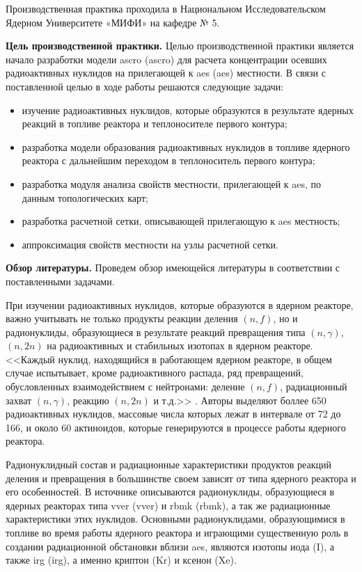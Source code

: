 
Производственная практика проходила в Национальном Исследовательском Ядерном Университете «МИФИ» на кафедре № 5. 

\textbf{Цель производственной практики.} Целью производственной практики является начало разработки модели \ac{ascro} 
(\acl{ascro}) для расчета концентрации осевших радиоактивных нуклидов на прилегающей к \ac{aes} (\acl{aes}) местности. 
В связи с поставленной целью в ходе работы решаются следующие задачи:

\begin{itemize}
	\item изучение радиоактивных нуклидов, которые образуются в результате ядерных реакций в топливе реактора и 
		теплоносителе первого контура;
	\item разработка модели образования радиоактивных нуклидов в топливе ядерного реактора с дальнейшим переходом в
		теплоноситель первого контура;
	\item разработка модуля анализа свойств местности, прилегающей к \ac{aes}, по данным топологических карт;
	\item разработка расчетной сетки, описывающей прилегающую к \ac{aes} местность;
	\item аппроксимация свойств местности на узлы расчетной сетки.
\end{itemize}

\textbf{Обзор литературы.} Проведем обзор имеющейся литературы в соответствии с поставленными задачами.

При изучении радиоактивных нуклидов, которые образуются в ядерном реакторе, важно учитывать не только продукты реакции 
деления $(n, f)$, но и радионуклиды, образующиеся в результате реакций превращения типа $(n, \gamma)$, $(n, 2n)$ на 
радиоактивных и стабильных изотопах в ядерном реакторе. <<Каждый нуклид, находящийся в работающем ядерном реакторе, в 
общем случае испытывает, кроме радиоактивного распада, ряд превращений, обусловленных взаимодействием с нейтронами: 
деление $(n, f)$, радиационный захват $(n, \gamma)$, реакцию $(n, 2n)$ и т.д.>> \citep[с.~6]{kolobashkin}.  
Авторы \cite{kolobashkin} выделяют боллее 650 радиоактивных нуклидов, массовые числа которых лежат в интервале от 72 до 
166, и около 60 актиноидов, которые генерируются в процессе работы ядерного реактора.

Радионуклидный состав и радиационные характеристики продуктов реакций деления и превращения в большинстве своем зависят 
от типа ядерного реактора и его особенностей. В источнике \cite{gusev_bio} описываются радионуклиды, образующиеся в 
ядерных реакторах типа \ac{vver} (\acl{vver}) и \ac{rbmk} (\acl{rbmk}), а так же радиационные характеристики этих 
нуклидов. Основными радионуклидами, образующимися в топливе во время работы ядерного реактора и играющими существенную 
роль в создании радиационной обстановки вблизи \ac{aes}, являются изотопы иода (I), а также \ac{irg} (\acl{irg}), а 
именно криптон (Kr) и ксенон (Xe).

